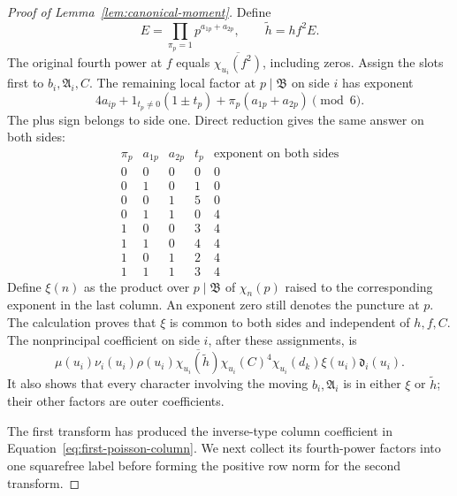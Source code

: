 \documentclass[11pt,a4paper]{article}
\numberwithin{equation}{section}
\numberwithin{figure}{section}
\theoremstyle{definition}
\theoremstyle{remark}
\begin{document}
\begin{proof}[Proof of Lemma~\ref{lem:canonical-moment}]
Define
\[
 E=\prod_{\pi_p=1}p^{a_{1p}+a_{2p}},\qquad
 \widetilde h=hf^2E.
\]
The original fourth power at \(f\) equals
\(\overline{\chi_{u_i}(f^2)}\), including zeros.  Assign the slots
first to \(b_i,\mathfrak A_i,C\).  The remaining local factor at
\(p\mid\mathfrak B\) on side \(i\) has exponent
\[
 4a_{ip}+1_{t_p\ne0}(1\mathbin{\pm}t_p)
          +\pi_p(a_{1p}+a_{2p})\pmod6.
\]
The plus sign belongs to side one.  Direct reduction gives the same
answer on both sides:
\[
 \begin{array}{c|cc|c|c}
 \pi_p&a_{1p}&a_{2p}&t_p&\text{exponent on both sides}\\ \hline
 0&0&0&0&0\\
 0&1&0&1&0\\
 0&0&1&5&0\\
 0&1&1&0&4\\
 1&0&0&3&4\\
 1&1&0&4&4\\
 1&0&1&2&4\\
 1&1&1&3&4
 \end{array}
\]
Define \(\xi(n)\) as the product over \(p\mid\mathfrak B\) of
\(\chi_n(p)\) raised to the corresponding exponent in the last column.
An exponent zero still denotes the puncture at \(p\).  The calculation
proves that \(\xi\) is common to both sides and independent of \(h,f,C\).
The nonprincipal coefficient on side \(i\), after these assignments, is
\begin{equation}\tag{C}\label{eq:first-poisson-column}
 \mu(u_i)\nu_i(u_i)\rho(u_i)
 \overline{\chi_{u_i}(\widetilde h)}
 \chi_{u_i}(C)^4\chi_{u_i}(d_k)\xi(u_i)\mathfrak d_i(u_i).
\end{equation}
It also shows that every character involving the moving
\(b_i,\mathfrak A_i\) is in either \(\xi\) or \(\widetilde h\);
their other factors are outer coefficients.

The first transform has produced the inverse-type column coefficient
in Equation~\eqref{eq:first-poisson-column}.  We next collect its
fourth-power factors into one squarefree label before forming the
positive row norm for the second transform.


\end{proof}
\end{document}
